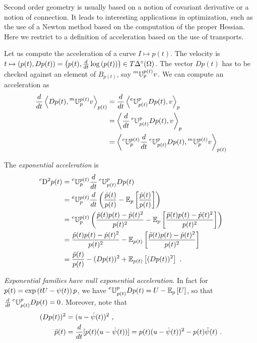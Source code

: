 \documentclass[12pt,a4paper]{amsart}
\begin{document}
Second order geometry is usually based on a notion of covariant derivative or a notion of connection. It leads to interesting applications in optimization, such as the use of a Newton method based on the computation of the proper Hessian. Here we restrict to a definition of acceleration based on the use of transports.

Let us compute the acceleration of a curve $I \mapsto p(t)$. The velocity is $t \mapsto (p(t),Dp(t)) = \left(p(t), \derivby t \logof {p(t)} \right) \in \ToSimO$. The vector $Dp(t)$ has to be checked against an element of $B_{p(t)}$, say $\mtransport p {p(t)} v$. We can compute an acceleration as
%
\begin{align*}
  \derivby t \scalarat {p(t)} {Dp(t)}{\mtransport p {p(t)} v} &= \derivby t \scalarat {p} {\etransport {p(t)} p Dp(t)}{v} \\ &= \scalarat {p} {\derivby t \etransport {p(t)} p Dp(t)}{v} \\ &=  \scalarat {p(t)} {\etransport p {p(t)} \derivby t \etransport {p(t)} p Dp(t)}{\mtransport p {p(t)} v}  
\end{align*}

The \emph{exponential acceleration} is
%
\begin{align*}
  \eacc p(t) &= \etransport p {p(t)} \derivby t \etransport {p(t)} p Dp(t) \\ &=  \etransport p {p(t)} \derivby t \left(\frac{\dot p(t)}{p(t)} - \expectat p {\frac{\dot p(t)}{p(t)}}\right) \\ &=  \etransport p {p(t)} \left(\frac{\ddot p(t)p(t)-\dot p(t)^2}{p(t)^2} - \expectat p {\frac{\ddot p(t)p(t)-\dot p(t)^2}{p(t)^2}}\right) \\ &= \frac{\ddot p(t)p(t)-\dot p(t)^2}{p(t)^2} - \expectat {p(t)} {\frac{\ddot p(t)p(t)-\dot p(t)^2}{p(t)^2}} \\ &= \frac{\ddot p(t)}{p(t)} - (Dp(t))^2 + \expectat {p(t)} {(Dp(t))^2} \ .
\end{align*}

\emph{Exponential families have null exponential acceleration}. In fact for $p(t) = \expof{tU - \psi(t)} p$, we have $\etransport {p(t)} p Dp(t) = U - \expectat p U$, so that $\derivby t \etransport {p(t)} p Dp(t) = 0$. Moreover, note that
%
\begin{align*}
  (Dp(t))^2 &= (u - \dot \psi(t))^2 \ ,\\
  \ddot p(t) &= \derivby t [p(t)(u - \dot \psi(t))] = p(t)(u-\dot\psi(t))^2 - p(t)\ddot\psi(t) \ . 
\end{align*}
\end{document}
